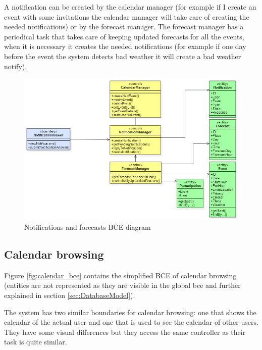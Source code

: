 \documentclass[10pt,a4paper,titlepage]{article}
\begin{document}
A notification can be created by the calendar manager (for example if I create an event with some invitations the calendar manager will take care of creating the needed notifications) or by the forecast manager. The forecast manager has a periodical task that takes care of keeping updated forecasts for all the events, when it is necessary it creates the needed notifications (for example if one day before the event the system detects bad weather it will create a bad weather notify).
\begin{figure}[h]
\centering
\includegraphics[width=\linewidth]{./bce/notification_bce}
\caption[notification bce]{Notifications and forecasts BCE diagram}
\label{fig:notification_bce}
\end{figure}

\subsection{Calendar browsing}
Figure \ref{fig:calendar_bce} contains the simplified BCE of calendar browsing (entities are not represented as they are visible in the global bce and further explained in section \ref{sec:DatabaseModel}).

The system has two similar boundaries for calendar browsing: one that shows the calendar of the actual user and one that is used to see the calendar of other users. They have some visual differences but they access the same controller as their task is quite similar.
\end{document}

